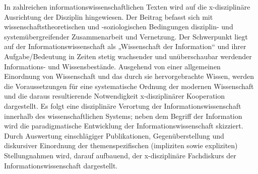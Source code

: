 In zahlreichen informationswissenschaftlichen Texten wird auf die
x-disziplinäre Ausrichtung der Disziplin hingewiesen. Der Beitrag
befasst sich mit wissenschaftstheoretischen und -soziologischen
Bedingungen disziplin- und systemübergreifender Zusammenarbeit und
Vernetzung. Der Schwerpunkt liegt auf der Informationswissenschaft als
„Wissenschaft der Information`` und ihrer Aufgabe/Bedeutung in Zeiten
stetig wachsender und unüberschaubar werdender Informations- und
Wissensbestände. Ausgehend von einer allgemeinen Einordnung von
Wissenschaft und das durch sie hervorgebrachte Wissen, werden die
Voraussetzungen für eine systematische Ordnung der modernen Wissenschaft
und die daraus resultierende Notwendigkeit x-disziplinärer Kooperation
dargestellt. Es folgt eine disziplinäre Verortung der
Informationswissenschaft innerhalb des wissenschaftlichen Systems; neben
dem Begriff der Information wird die paradigmatische Entwicklung der
Informationswissenschaft skizziert. Durch Auswertung einschlägiger
Publikationen, Gegenüberstellung und diskursiver Einordnung der
themenspezifischen (impliziten sowie expliziten) Stellungnahmen wird,
darauf aufbauend, der x-disziplinäre Fachdiskurs der
Informationswissenschaft dargestellt.
